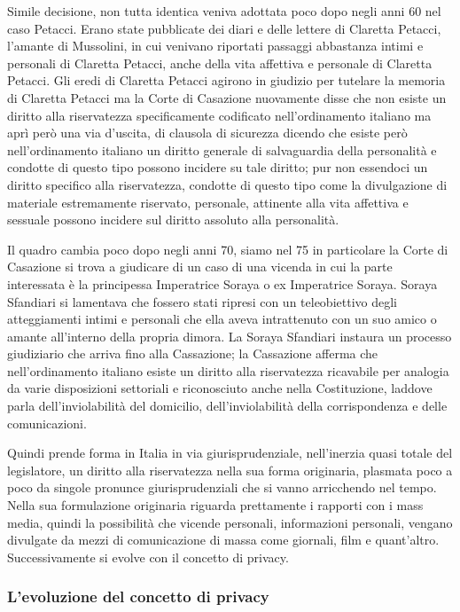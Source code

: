 Simile decisione, non tutta identica veniva adottata poco dopo negli anni 60 nel caso Petacci. Erano state pubblicate dei diari e delle lettere di Claretta Petacci, l'amante di Mussolini, in cui venivano riportati passaggi abbastanza intimi e personali di Claretta Petacci, anche della vita affettiva e personale di Claretta Petacci. Gli eredi di Claretta Petacci agirono in giudizio per tutelare la memoria di Claretta Petacci ma la Corte di Casazione nuovamente disse che non esiste un diritto alla riservatezza specificamente codificato nell'ordinamento italiano ma aprì però una via d'uscita,  di clausola di sicurezza dicendo che esiste però nell'ordinamento italiano un diritto generale di salvaguardia della personalità e condotte di questo tipo possono incidere su tale diritto; pur non essendoci un diritto specifico alla riservatezza, condotte di questo tipo come la divulgazione di materiale estremamente riservato, personale, attinente alla vita affettiva e sessuale possono incidere sul diritto assoluto alla personalità. 

Il quadro cambia poco dopo negli anni 70, siamo nel 75 in particolare la Corte di Casazione si trova a giudicare di un caso di una vicenda in cui la parte interessata è la principessa Imperatrice Soraya o ex Imperatrice Soraya. 
Soraya Sfandiari si lamentava che fossero stati ripresi con un teleobiettivo degli atteggiamenti intimi e personali che ella aveva intrattenuto con un suo amico o amante all'interno della propria dimora. La Soraya Sfandiari instaura un processo giudiziario che arriva fino alla Cassazione; la Cassazione afferma che nell'ordinamento italiano esiste un diritto alla riservatezza ricavabile per analogia da varie disposizioni settoriali e riconosciuto anche nella Costituzione, laddove parla dell'inviolabilità del domicilio, dell'inviolabilità della corrispondenza e delle comunicazioni. 

Quindi prende forma in Italia in via giurisprudenziale, nell'inerzia quasi totale del legislatore, un diritto alla riservatezza nella sua forma originaria, plasmata poco a poco da singole pronunce giurisprudenziali che si vanno arricchendo nel tempo. Nella sua formulazione originaria riguarda prettamente i rapporti con i mass media, quindi la possibilità che vicende personali, informazioni personali, vengano divulgate da mezzi di comunicazione di massa come giornali, film e quant'altro. Successivamente si evolve con il concetto di privacy.

\subsubsection{L'evoluzione del concetto di privacy}


